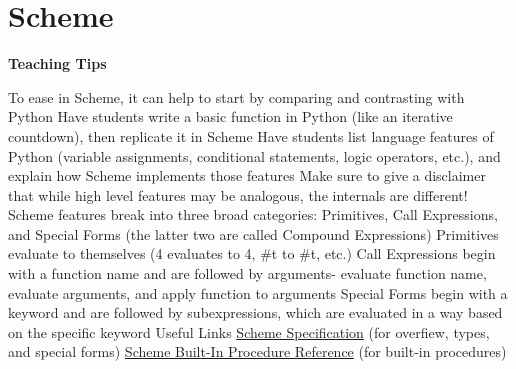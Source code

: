 \documentclass{exam}
\begin{document}
\section{Scheme}
\begin{guide}
\begin{blocksection}
\textbf{Teaching Tips}
\begin{outline}[enumerate]
    \1 To ease in Scheme, it can help to start by comparing and contrasting with Python
    \2 Have students write a basic function in Python (like an iterative countdown), then replicate it in Scheme
    \2 Have students list language features of Python (variable assignments, conditional statements, logic operators, etc.), and explain how Scheme implements those features
    \2 Make sure to give a disclaimer that while high level features may be analogous, the internals are different!
    \1 Scheme features break into three broad categories: Primitives, Call Expressions, and Special Forms (the latter two are called Compound Expressions)
    \2 Primitives evaluate to themselves (4 evaluates to 4, \#t to \#t, etc.)
    \2 Call Expressions begin with a function name and are followed by arguments- evaluate function name, evaluate arguments, and apply function to arguments
    \2 Special Forms begin with a keyword and are followed by subexpressions, which are evaluated in a way based on the specific keyword
    \1 Useful Links
    \2 \href{https://cs61a.org/articles/scheme-spec/}{Scheme Specification} (for overfiew, types, and special forms)
    \2 \href{https://cs61a.org/articles/scheme-builtins/}{Scheme Built-In Procedure Reference} (for built-in procedures)
\end{outline}
\end{blocksection}
\end{guide}
\end{document}
